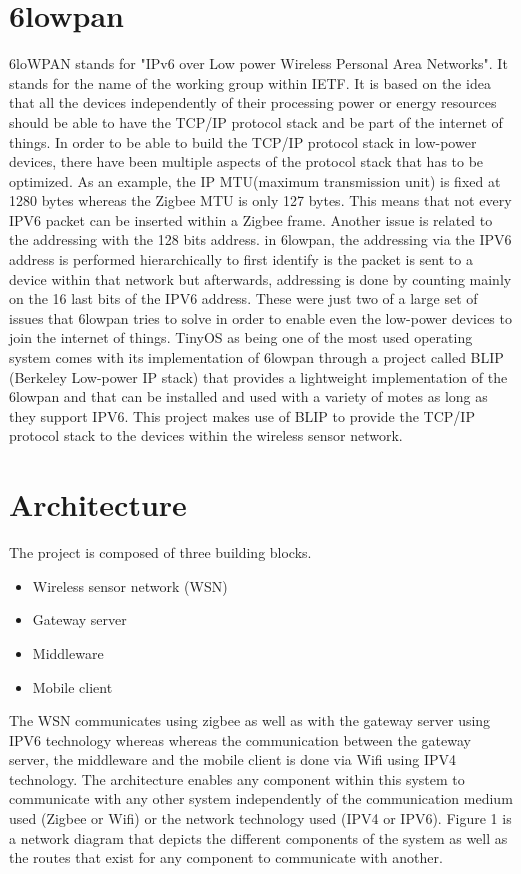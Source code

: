 \documentclass[conference]{IEEEtran}
\begin{document}
\section{6lowpan}
6loWPAN stands for  "IPv6 over Low power Wireless Personal Area Networks". It stands for the name of the working group within IETF. It is based on the idea that all the devices independently of their processing power or energy resources should be able to have the TCP/IP protocol stack and be part of the internet of things. In order to be able to build the TCP/IP protocol stack in low-power devices, there have been multiple aspects of the protocol stack that has to be optimized. As an example, the IP MTU(maximum transmission unit) is fixed at 1280 bytes whereas the Zigbee MTU is only 127 bytes. This means that not every IPV6 packet can be inserted within a Zigbee frame. Another issue is related to the addressing with the 128 bits address. in 6lowpan, the addressing via the IPV6 address is performed hierarchically to first identify is the packet is sent to a device within that network but afterwards, addressing is done by counting mainly on the 16 last bits of the IPV6 address. These were just two of a large set of issues that 6lowpan tries to solve in order to enable even the low-power devices to join the internet of things. TinyOS as being one of the most used operating system comes with its implementation of 6lowpan through a project called BLIP (Berkeley Low-power IP stack) that provides a lightweight implementation of the 6lowpan and that can be installed and used with a variety of motes as long as they support IPV6. This project makes use of BLIP to provide the TCP/IP protocol stack to the devices within the wireless sensor network.
\section{Architecture}
The project is composed of three building blocks. 
\begin{itemize}
\item Wireless sensor network (WSN)
\item Gateway server
\item Middleware
\item Mobile client
\end{itemize}
The WSN communicates using zigbee as well as with the gateway server using IPV6 technology whereas whereas the communication between the gateway server, the middleware and the mobile client is done via Wifi using IPV4 technology. The architecture enables any component within this system to communicate with any other system independently of the communication medium used (Zigbee or Wifi) or the network technology used (IPV4 or IPV6). Figure 1 is a network diagram that depicts the different components of the system as well as the routes that exist for any component to communicate with another.
\end{document}
